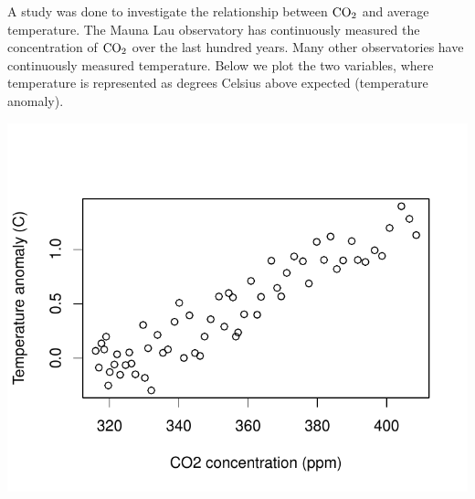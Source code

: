 \documentclass[12pt,letterpaper,addpoints]{exam}
\begin{document}
\begin{questions}
\newpage
\question[10] A study was done to investigate the relationship between $\rm{CO}_2$ and average temperature. The Mauna Lau observatory has continuously measured the concentration of $\rm{CO}_2$ over the last hundred years. Many other observatories have continuously measured temperature. Below we plot the two variables, where temperature is represented as degrees Celsius above expected (temperature anomaly).
\vspace{-0.7in}
\begin{center}
\includegraphics[scale=0.8]{figures/co2temp.pdf}
\end{center}
\end{questions}
\end{document}
